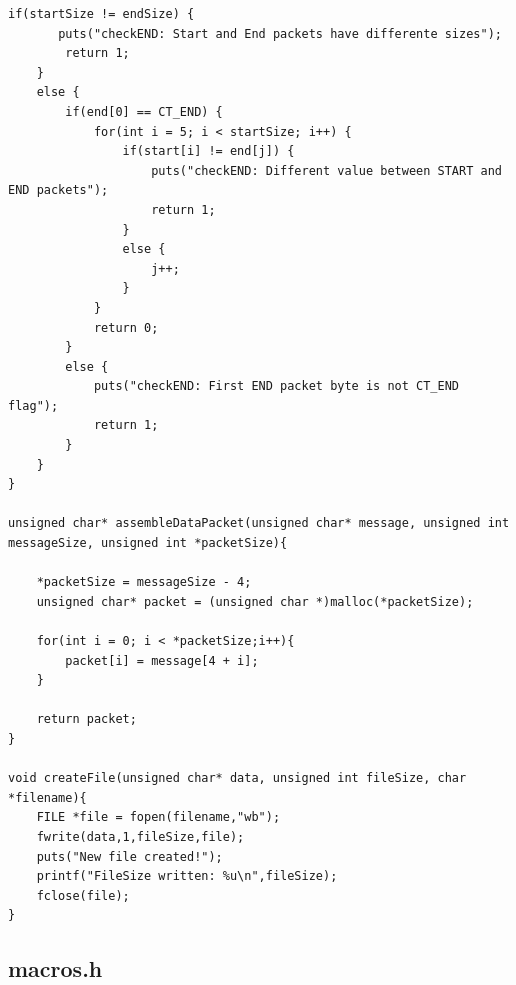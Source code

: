 \documentclass[11pt]{article}
\begin{document}
\begin{lstlisting}[style=CStyle]
    if(startSize != endSize) {
       puts("checkEND: Start and End packets have differente sizes");
        return 1;
    }
    else {
        if(end[0] == CT_END) {
            for(int i = 5; i < startSize; i++) {
                if(start[i] != end[j]) {
                    puts("checkEND: Different value between START and END packets");
                    return 1;
                }
                else {
                    j++;
                }  
            }
            return 0;
        }
        else {
            puts("checkEND: First END packet byte is not CT_END flag");
            return 1;
        }
    }
}

unsigned char* assembleDataPacket(unsigned char* message, unsigned int messageSize, unsigned int *packetSize){

    *packetSize = messageSize - 4;
    unsigned char* packet = (unsigned char *)malloc(*packetSize);

    for(int i = 0; i < *packetSize;i++){
        packet[i] = message[4 + i];
    }

    return packet;
}

void createFile(unsigned char* data, unsigned int fileSize, char *filename){
    FILE *file = fopen(filename,"wb");
    fwrite(data,1,fileSize,file);
    puts("New file created!");
    printf("FileSize written: %u\n",fileSize);
    fclose(file);
}

\end{lstlisting}

\pagebreak




\subsection{macros.h}
\end{document}
